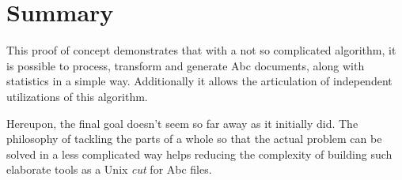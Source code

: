 \documentclass[main.tex]{subfiles}
\begin{document}
\section{Summary}

This proof of concept demonstrates that with a not so complicated algorithm, it is possible to
process, transform and generate Abc documents, along with statistics in a simple way. Additionally
it allows the articulation of independent utilizations of this algorithm.

Hereupon, the final goal doesn't seem so far away as it initially did. The philosophy of tackling
the parts of a whole so that the actual problem can be solved in a less complicated way helps
reducing the complexity of building such elaborate tools as a Unix \textit{cut} for Abc files.\\
\end{document}
